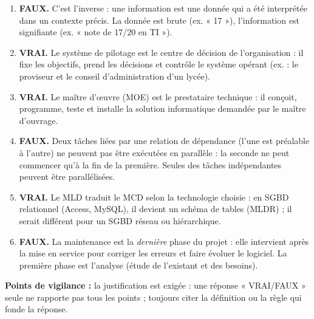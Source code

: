 \documentclass[11pt]{article}
\newcommand{\cle}[1]{{\popxbold\color{popdark}#1}}
\begin{document}
\begin{corrige}
\begin{enumerate}
  \item \textbf{FAUX.} C'est l'inverse : une \cle{information} est une donnée qui a été interprétée dans un contexte précis. La donnée est brute (ex. « 17 »), l'information est signifiante (ex. « note de 17/20 en TI »).
  \item \textbf{VRAI.} Le \cle{système de pilotage} est le centre de décision de l'organisation : il fixe les objectifs, prend les décisions et contrôle le système opérant (ex. : le proviseur et le conseil d'administration d'un lycée).
  \item \textbf{VRAI.} Le \cle{maître d'œuvre} (MOE) est le prestataire technique : il conçoit, programme, teste et installe la solution informatique demandée par le maître d'ouvrage.
  \item \textbf{FAUX.} Deux tâches liées par une relation de dépendance (l'une est préalable à l'autre) ne peuvent pas être exécutées en parallèle : la seconde ne peut commencer qu'à la fin de la première. Seules des tâches indépendantes peuvent être parallélisées.
  \item \textbf{VRAI.} Le \cle{MLD} traduit le MCD selon la technologie choisie : en SGBD relationnel (Access, MySQL), il devient un schéma de tables (MLDR) ; il serait différent pour un SGBD réseau ou hiérarchique.
  \item \textbf{FAUX.} La \cle{maintenance} est la \emph{dernière} phase du projet : elle intervient après la mise en service pour corriger les erreurs et faire évoluer le logiciel. La première phase est l'\cle{analyse} (étude de l'existant et des besoins).
\end{enumerate}
\textbf{Points de vigilance :} la justification est exigée : une réponse « VRAI/FAUX » seule ne rapporte pas tous les points ; toujours citer la définition ou la règle qui fonde la réponse.
\end{corrige}
\end{document}
